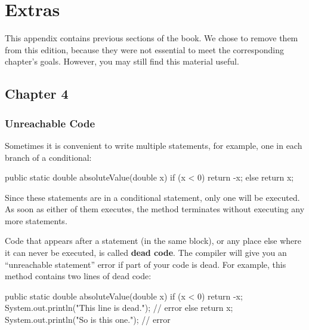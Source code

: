 \chapter{Extras}
\label{extras}


This appendix contains previous sections of the book.
We chose to remove them from this edition, because they were not essential to meet the corresponding chapter's goals.
However, you may still find this material useful.



\section{Chapter 4}

\subsection*{Unreachable Code}

Sometimes it is convenient to write multiple  statements, for example, one in each branch of a conditional:

\begin{code}
public static double absoluteValue(double x) {
    if (x < 0) {
        return -x;
    } else {
        return x;
    }
}
\end{code}

Since these  statements are in a conditional statement, only one will be executed.
As soon as either of them executes, the method terminates without executing any more statements.


Code that appears after a  statement (in the same block), or any place else where it can never be executed, is called {\bf dead code}.
The compiler will give you an ``unreachable statement'' error if part of your code is dead.
For example, this method contains two lines of dead code:

\begin{code}
public static double absoluteValue(double x) {
    if (x < 0) {
        return -x;
        System.out.println("This line is dead.");  // error
    } else {
        return x;
    }
    System.out.println("So is this one.");  // error
}
\end{code}


